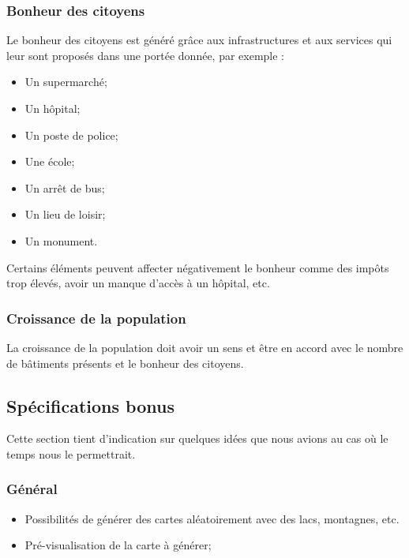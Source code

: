 \documentclass[a4paper,10pt,openany,oneside]{report}
\begin{document}
\subsubsection{Bonheur des citoyens}
Le bonheur des citoyens est généré grâce aux infrastructures et aux services qui leur sont proposés dans une portée donnée, par exemple :
\begin{itemize}
\item Un supermarché;
\item Un hôpital;
\item Un poste de police;
\item Une école;
\item Un arrêt de bus;
\item Un lieu de loisir;
\item Un monument.
\end{itemize}
Certains éléments peuvent affecter négativement le bonheur comme des impôts trop élevés, avoir un manque d'accès à un hôpital, etc. 

\subsubsection{Croissance de la population}
La croissance de la population doit avoir un sens et être en accord avec le nombre de bâtiments présents et le bonheur des citoyens. 


\subsection{Spécifications bonus}
Cette section tient d'indication sur quelques idées que nous avions au cas où le temps nous le permettrait.

\subsubsection{Général}
\begin{itemize}
\item Possibilités de générer des cartes aléatoirement avec des lacs, montagnes, etc.
\item Pré-visualisation de la carte à générer;
\end{itemize}
\end{document}
